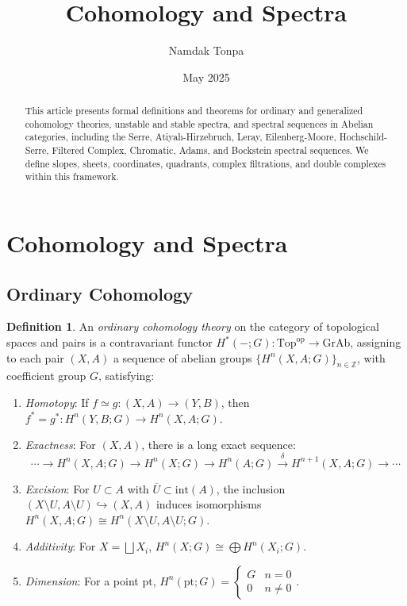 \documentclass{article}
\theoremstyle{plain}
\theoremstyle{definition}
\newtheorem{definition}{Definition}
\newcommand{\Z}{\mathbb{Z}}
\newcommand{\pt}{\text{pt}}
\begin{document}
\title{Cohomology and Spectra}
\author{Namdak Tonpa}
\date{May 2025}

\maketitle

\begin{abstract}
This article presents formal definitions and theorems for ordinary and generalized cohomology theories, unstable and stable spectra, and spectral sequences in Abelian categories, including the Serre, Atiyah-Hirzebruch, Leray, Eilenberg-Moore, Hochschild-Serre, Filtered Complex, Chromatic, Adams, and Bockstein spectral sequences. We define slopes, sheets, coordinates, quadrants, complex filtrations, and double complexes within this framework.
\end{abstract}

\tableofcontents

\newpage
\section{Cohomology and Spectra}

\subsection{Ordinary Cohomology}

\begin{definition}
An \emph{ordinary cohomology theory} on the category of topological spaces and pairs is a contravariant functor \( H^*(-; G): \text{Top}^{\text{op}} \to \text{GrAb} \), assigning to each pair \( (X, A) \) a sequence of abelian groups \( \{ H^n(X, A; G) \}_{n \in \Z} \), with coefficient group \( G \), satisfying:
\begin{enumerate}
    \item \emph{Homotopy}: If \( f \simeq g: (X, A) \to (Y, B) \), then \( f^* = g^*: H^n(Y, B; G) \to H^n(X, A; G) \).
    \item \emph{Exactness}: For \( (X, A) \), there is a long exact sequence:
    \[
    \cdots \to H^n(X, A; G) \to H^n(X; G) \to H^n(A; G) \xrightarrow{\delta} H^{n+1}(X, A; G) \to \cdots
    \]
    \item \emph{Excision}: For \( U \subset A \) with \( \overline{U} \subset \text{int}(A) \), the inclusion \( (X \setminus U, A \setminus U) \hookrightarrow (X, A) \) induces isomorphisms \( H^n(X, A; G) \cong H^n(X \setminus U, A \setminus U; G) \).
    \item \emph{Additivity}: For \( X = \bigsqcup X_i \), \( H^n(X; G) \cong \bigoplus H^n(X_i; G) \).
    \item \emph{Dimension}: For a point \( \pt \), \( H^n(\pt; G) = \begin{cases} G & n = 0 \\ 0 & n \neq 0 \end{cases} \).
\end{enumerate}
\end{definition}
\end{document}
